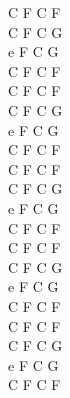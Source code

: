 \documentclass[a5paper, 10pt]{book}
\begin{document}
\begin{minipage}[t]{0.2\textwidth}
C F C F\\
C F C G\\
e F C G\\
C F C F\\

C F C F\\
C F C G\\
e F C G\\
C F C F\\

C F C F\\
C F C G\\
e F C G\\
C F C F\\

C F C F\\
C F C G\\
e F C G\\
C F C F\\

C F C F\\
C F C G\\
e F C G\\
C F C F\\

\end{minipage}

\newpage
\end{document}
